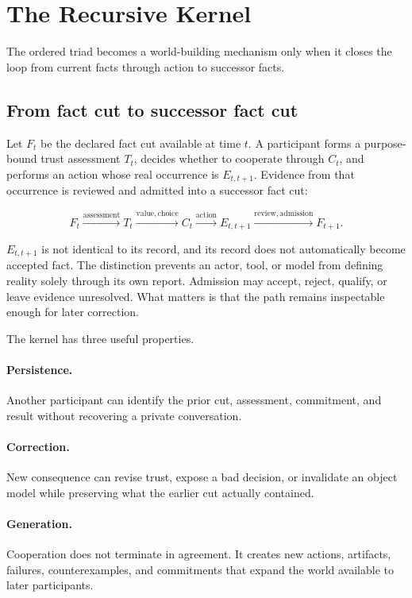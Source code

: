 \section{The Recursive Kernel}
\label{sec:kernel}

The ordered triad becomes a world-building mechanism only when it closes the
loop from current facts through action to successor facts.

\subsection{From fact cut to successor fact cut}

Let $F_t$ be the declared fact cut available at time $t$. A participant forms
a purpose-bound trust assessment $T_t$, decides whether to cooperate through
$C_t$, and performs an action whose real occurrence is $E_{t,t+1}$. Evidence
from that occurrence is reviewed and admitted into a successor fact cut:

\begin{equation}
F_t
\xrightarrow{\mathrm{assessment}} T_t
\xrightarrow{\mathrm{value,choice}} C_t
\xrightarrow{\mathrm{action}} E_{t,t+1}
\xrightarrow{\mathrm{review,admission}} F_{t+1}.
\label{eq:recursive-kernel}
\end{equation}

$E_{t,t+1}$ is not identical to its record, and its record does not
automatically become accepted fact. The distinction prevents an actor, tool,
or model from defining reality solely through its own report. Admission may
accept, reject, qualify, or leave evidence unresolved. What matters is that
the path remains inspectable enough for later correction.

The kernel has three useful properties.

\paragraph{Persistence.}
Another participant can identify the prior cut, assessment, commitment, and
result without recovering a private conversation.

\paragraph{Correction.}
New consequence can revise trust, expose a bad decision, or invalidate an
object model while preserving what the earlier cut actually contained.

\paragraph{Generation.}
Cooperation does not terminate in agreement. It creates new actions,
artifacts, failures, counterexamples, and commitments that expand the world
available to later participants.

